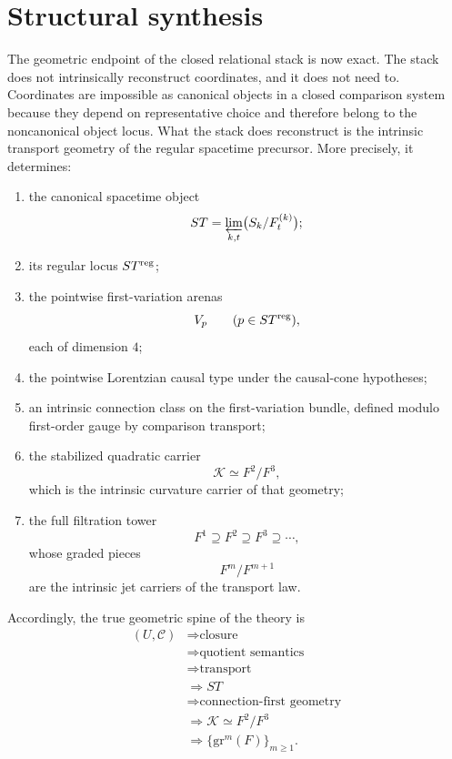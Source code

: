 \section{Structural synthesis}
\label{sec:connection-conclusion}
The geometric endpoint of the closed relational stack is now exact.
The stack does not intrinsically reconstruct coordinates, and it does
not need to.  Coordinates are impossible as canonical objects in a
closed comparison system because they depend on representative choice
and therefore belong to the noncanonical object locus.
What the stack does reconstruct is the intrinsic transport geometry of
the regular spacetime precursor.
More precisely, it determines:
\begin{enumerate}[label=\textup{(\roman*)}]
	\item
	      the canonical spacetime object
	      \[
		      ST=\varprojlim_{k,t}\bigl(S_k/F_t^{(k)}\bigr);
	      \]
	\item
	      its regular locus \(ST^{\mathrm{reg}}\);
	\item
	      the pointwise first-variation arenas
	      \[
		      V_p
		      \qquad (p\in ST^{\mathrm{reg}}),
	      \]
	      each of dimension \(4\);
	\item
	      the pointwise Lorentzian causal type under the causal-cone hypotheses;
	\item
	      an intrinsic connection class on the first-variation bundle, defined
	      modulo first-order gauge by comparison transport;
	\item
	      the stabilized quadratic carrier
	      \[
		      \mathcal K\simeq F^2/F^3,
	      \]
	      which is the intrinsic curvature carrier of that geometry;
	\item
	      the full filtration tower
	      \[
		      F^1\supseteq F^2\supseteq F^3\supseteq\cdots,
	      \]
	      whose graded pieces
	      \[
		      F^m/F^{m+1}
	      \]
	      are the intrinsic jet carriers of the transport law.
\end{enumerate}
Accordingly, the true geometric spine of the theory is
\[
	\begin{aligned}
		(U,\mathcal C) & \Longrightarrow \text{closure}                   \\
		               & \Longrightarrow \text{quotient semantics}        \\
		               & \Longrightarrow \text{transport}                 \\
		               & \Longrightarrow ST                               \\
		               & \Longrightarrow \text{connection-first geometry} \\
		               & \Longrightarrow \mathcal K \simeq F^2/F^3        \\
		               & \Longrightarrow \{\text{gr}^m(F)\}_{m \ge 1}.
	\end{aligned}
\]
